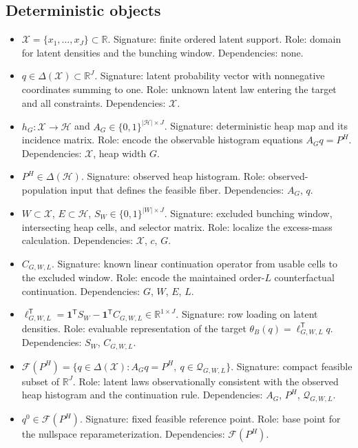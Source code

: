\documentclass[11pt]{article}
\newcommand{\one}{\mathbf{1}}
\newcommand{\transpose}{\mathsf{T}}
\theoremstyle{definition}
\theoremstyle{plain}
\theoremstyle{remark}
\begin{document}
\subsection*{Deterministic objects}
\begin{itemize}[leftmargin=*]
  \item \(\mathcal{X}=\{x_1,\ldots,x_J\}\subset\mathbb{R}\).  Signature: finite ordered latent support.  Role: domain for latent densities and the bunching window.  Dependencies: none.
  \item \(q\in\Delta(\mathcal{X})\subset\mathbb{R}^J\).  Signature: latent probability vector with nonnegative coordinates summing to one.  Role: unknown latent law entering the target and all constraints.  Dependencies: \(\mathcal{X}\).
  \item \(h_G:\mathcal{X}\to\mathcal{H}\) and \(A_G\in\{0,1\}^{|\mathcal{H}|\times J}\).  Signature: deterministic heap map and its incidence matrix.  Role: encode the observable histogram equations \(A_Gq=P^H\).  Dependencies: \(\mathcal{X}\), heap width \(G\).
  \item \(P^H\in\Delta(\mathcal{H})\).  Signature: observed heap histogram.  Role: observed-population input that defines the feasible fiber.  Dependencies: \(A_G\), \(q\).
  \item \(W\subset\mathcal{X}\), \(E\subset\mathcal{H}\), \(S_W\in\{0,1\}^{|W|\times J}\).  Signature: excluded bunching window, intersecting heap cells, and selector matrix.  Role: localize the excess-mass calculation.  Dependencies: \(\mathcal{X}\), \(c\), \(G\).
  \item \(C_{G,W,L}\).  Signature: known linear continuation operator from usable cells to the excluded window.  Role: encode the maintained order-\(L\) counterfactual continuation.  Dependencies: \(G\), \(W\), \(E\), \(L\).
  \item \(\ell_{G,W,L}^{\transpose}=\one^{\transpose}S_W-\one^{\transpose}C_{G,W,L}\in\mathbb{R}^{1\times J}\).  Signature: row loading on latent densities.  Role: evaluable representation of the target \(\theta_B(q)=\ell_{G,W,L}^{\transpose}q\).  Dependencies: \(S_W\), \(C_{G,W,L}\).
  \item \(\mathcal{F}(P^H)=\{q\in\Delta(\mathcal{X}):A_Gq=P^H,\ q\in\mathcal{Q}_{G,W,L}\}\).  Signature: compact feasible subset of \(\mathbb{R}^J\).  Role: latent laws observationally consistent with the observed heap histogram and the continuation rule.  Dependencies: \(A_G\), \(P^H\), \(\mathcal{Q}_{G,W,L}\).
  \item \(q^0\in\mathcal{F}(P^H)\).  Signature: fixed feasible reference point.  Role: base point for the nullspace reparameterization.  Dependencies: \(\mathcal{F}(P^H)\).

\end{itemize}
\end{document}
